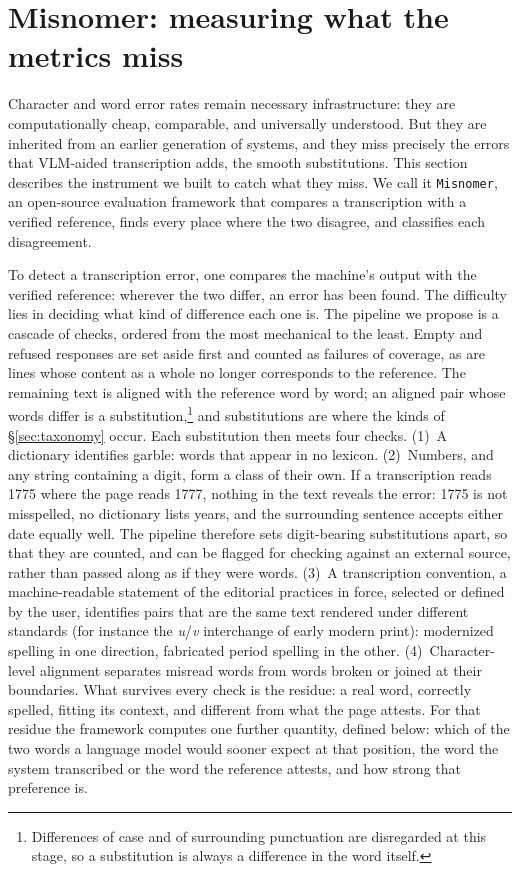 \documentclass{anthology-ch}         %
\begin{document}
\section{Misnomer: measuring what the metrics miss}\label{sec:misnomer}

Character and word error rates remain necessary infrastructure: they are computationally cheap, comparable, and universally understood. But they are inherited from an earlier generation of systems, and they miss precisely the errors that VLM-aided transcription adds, the smooth substitutions. This section describes the instrument we built to catch what they miss. We call it \texttt{Misnomer}, an open-source evaluation framework that compares a transcription with a verified reference, finds every place where the two disagree, and classifies each disagreement. 

To detect a transcription error, one compares the machine's output with the verified reference: wherever the two differ, an error has been found. The difficulty lies in deciding what kind of difference each one is. The pipeline we propose is a cascade of checks, ordered from the most mechanical to the least. Empty and refused responses are set aside first and counted as failures of coverage, as are lines whose content as a whole no longer corresponds to the reference. The remaining text is aligned with the reference word by word; an aligned pair whose words differ is a substitution,\footnote{Differences of case and of surrounding punctuation are disregarded at this stage, so a substitution is always a difference in the word itself.} and substitutions are where the kinds of \S\ref{sec:taxonomy} occur. Each substitution then meets four checks. (1)~A dictionary identifies garble: words that appear in no lexicon. (2)~Numbers, and any string containing a digit, form a class of their own. If a transcription reads 1775 where the page reads 1777, nothing in the text reveals the error: 1775 is not misspelled, no dictionary lists years, and the surrounding sentence accepts either date equally well. The pipeline therefore sets digit-bearing substitutions apart, so that they are counted, and can be flagged for checking against an external source, rather than passed along as if they were words. (3)~A transcription convention, a machine-readable statement of the editorial practices in force, selected or defined by the user, identifies pairs that are the same text rendered under different standards (for instance the \emph{u}/\emph{v} interchange of early modern print): modernized spelling in one direction, fabricated period spelling in the other. (4)~Character-level alignment separates misread words from words broken or joined at their boundaries. What survives every check is the residue: a real word, correctly spelled, fitting its context, and different from what the page attests. For that residue the framework computes one further quantity, defined below: which of the two words a language model would sooner expect at that position, the word the system transcribed or the word the reference attests, and how strong that preference is.
\end{document}
